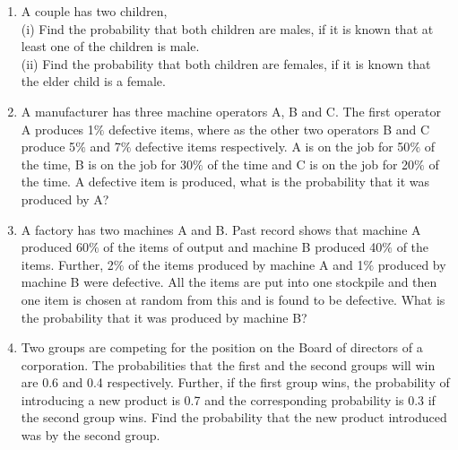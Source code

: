 \begin{enumerate}[label=\thesection.\arabic*.,ref=\thesection.\theenumi]
\item A couple has two children,\\
(i) Find the probability that both children are males, if it is known that at least one of the children is male.\\
(ii) Find the probability that both children are females, if it is known that the elder child is a female.\\
\item A manufacturer has three machine operators A, B and C. The first operator A
produces 1$\%$ defective items, where as the other two operators B and C produce 5$\%$ and 7$\%$ defective items respectively. A is on the job for 50$\%$ of the time, B is on the job for 30$\%$ of the time and C is on the job for 20$\%$ of the time. A defective item is produced, what is the probability that it was produced by A?\\
\solution


\item A factory has two machines A and B. Past record shows that machine A produced 60$\%$ of the items of output and machine B produced 40$\%$ of the items. Further, 2$\%$ of the items produced by machine A and 1$\%$ produced by machine B were defective. All the items are put into one stockpile and then one item is chosen at random from this and is found to be defective. What is the probability that it was produced by machine B?\\
%
\solution

\item Two groups are competing for the position on the Board of directors of a corporation. The probabilities that the first and the second groups will win are 0.6 and 0.4 respectively. Further, if the first group wins, the probability of introducing a new product is 0.7 and the corresponding probability is 0.3 if the second group wins. Find the probability that the new product introduced was by the second group.\\
%
\solution



\end{enumerate}
